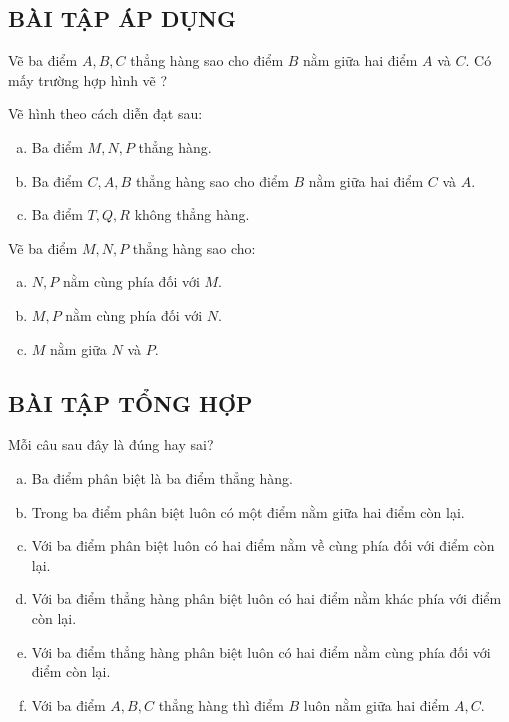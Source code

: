 \subsection{BÀI TẬP ÁP DỤNG}
\begin{bt}
Vẽ ba điểm $A, B, C$ thẳng hàng sao cho điểm $B$ nằm giữa hai điểm $A$ và $C$. Có mấy trường hợp hình vẽ ?
\end{bt}   \begin{bt}
Vẽ hình theo cách diễn đạt sau:
\begin{enumerate}[a)]
\item	Ba điểm $M, N, P$ thẳng hàng.
\item	Ba điểm $C, A, B$ thẳng hàng sao cho điểm $B$ nằm giữa hai điểm $C$ và $A$.
\item	Ba điểm $T, Q, R$ không thẳng hàng.
\end{enumerate}
\end{bt}   \begin{bt}
Vẽ ba điểm $M, N, P$ thẳng hàng sao cho:
\begin{enumerate}[a)]
\item $N, P$ nằm cùng phía đối với $M$.
\item $M, P$ nằm cùng phía đối với $N$.
\item $M$ nằm giữa $N$ và $P$.
\end{enumerate}
\subsection{BÀI TẬP TỔNG HỢP}
\end{bt}   \begin{bt}
Mỗi câu sau đây là đúng hay sai?
\begin{enumerate}[a)]
\item	Ba điểm phân biệt là ba điểm thẳng hàng.
\item	Trong ba điểm phân biệt luôn có một điểm nằm giữa hai điểm còn lại.
\item	Với ba điểm phân biệt luôn có hai điểm nằm về cùng phía đối với điểm còn lại.
\item	Với ba điểm thẳng hàng phân biệt luôn có hai điểm nằm khác phía với điểm còn lại.
\item	Với ba điểm thẳng hàng phân biệt luôn có hai điểm nằm cùng phía đối với điểm còn lại.
\item	Với ba điểm $A, B, C$ thẳng hàng thì điểm $B$ luôn nằm giữa hai điểm $A, C$.
\end{enumerate}


\end{bt}
